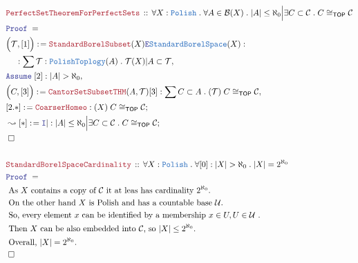 \documentclass[12pt]{scrartcl}
\newcommand{\TYPE}[1]{\textcolor{NavyBlue}{\mathtt{#1}}}
\newcommand{\LOGIC}[1]{\textcolor{Blue}{\mathtt{#1}}}
\newcommand{\THM}[1]{\textcolor{Maroon}{\mathtt{#1}}}
\renewcommand{\.}{\; . \;}
\newcommand{\de}{: \kern 0.1pc =}
\newcommand{\Theorem}[2]{& \THM{#1} \, :: \, #2 \\ & \Proof = \\ }
\newcommand{\NewLine}{\\ & \kern 1pc}
\newcommand{\Page}[1]{ \begin{align*} #1 \end{align*}   }
\newcommand{\Intro}{\LOGIC{I}}
\newcommand{\Elim}{\LOGIC{E}}
\newcommand{\Say}[3]{& #1 \de #2 : #3, \\}
\newcommand{\Conclude}[3]{& #1 \de #2 : #3; \\}
\newcommand{\DeriveConclude}[3]{& \leadsto #1 \de #2 : #3 ; \\}
\newcommand{\Assume}[2]{& \LOGIC{Assume} \; #1 : #2, \\}
\newcommand{\QED}{\; \square}
\newcommand{\EndProof}{& \QED \\}
\newcommand{\Proof}{\LOGIC{Proof} \; }
\newcommand{\Explain}[1]{& \text{#1.} \\}
\newcommand{\C}{\mathcal{C}}
\newcommand{\B}{\mathcal{B}}
\newcommand{\TOP}{\mathsf{TOP}}
\newcommand{\T}{\mathcal{T}}
\newcommand{\U}{\mathcal{U}}
\newcommand{\Polish}{\TYPE{Polish}}
\newcommand{\SBS}{\TYPE{StandardBorelSpace}}
\begin{document}
\Page{
	\Theorem{PerfectSetTheoremForPerfectSets}
	{
		\forall X : \Polish \.
		\forall A \in \B(X) \.
		|A| \le \aleph_0 \Big| 
		\exists C \subset \C \. 
		C \cong_\TOP \C
	}
	\Say{\Big( \T,[1]\Big)}{\THM{StandardBorelSubset}(X)\Elim \SBS(X)}
	{
		\NewLine :		
		\sum \T : \TYPE{PolishToplogy}(A) \.
		\T(X)|A \subset \T
	}
	\Assume{[2]}{|A| > \aleph_0}
	\Say{\Big(C,[3]\Big)}{\THM{CantorSetSubsetTHM}(A,\T)[3]}
	{
		\sum C \subset A \. (\T) \; C \cong_\TOP \C 	
	}
	\Conclude{[2.*]}{\THM{CoarserHomeo}}
	{
			(X) \; C \cong_\TOP \C
	}
	\DeriveConclude{[*]}{\Intro |}
	{
		|A| \le \aleph_0 \Big| 
		\exists C \subset \C \. 
		C \cong_\TOP \C
	}
	\EndProof
	\\
	\Theorem{StandardBorelSpaceCardinality}
	{
		\forall X : \Polish \.
		\forall [0] : |X| > \aleph_0 \.
		|X| = 2^{\aleph_0}	
	}
	\Explain{ As $X$ contains a copy of $\C$ it at leas has cardinality $2^{\aleph_0}$}
	\Explain{ On the other hand $X$ is Polish and has a countable base $\U$}
	\Explain{ So, every element $x$ can be identified by a membership $x \in U, U \in \U$ }
	\Explain{ Then $X$ can be also embedded into $\C$, so $|X| \le 2^{\aleph_0}$}
	\Explain{ Overall, $|X| = 2^{\aleph_0}$}
	\EndProof
}
\newpage
\end{document}
